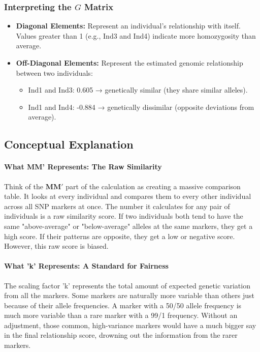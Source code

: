 \documentclass[12pt]{article}
\begin{document}
\subsubsection*{Interpreting the $G$ Matrix}

\begin{itemize}
    \item \textbf{Diagonal Elements:}
    Represent an individual's relationship with itself. Values greater than 1 (e.g., Ind3 and Ind4) indicate more homozygosity than average.

    \item \textbf{Off-Diagonal Elements:}
    Represent the estimated genomic relationship between two individuals:
    \begin{itemize}
        \item Ind1 and Ind3: 0.605 → genetically similar (they share similar alleles).
        \item Ind1 and Ind4: -0.884 → genetically dissimilar (opposite deviations from average).
    \end{itemize}
\end{itemize}

\subsection*{Conceptual Explanation}

\paragraph{What MM' Represents: The Raw Similarity}
Think of the $\mathbf{MM'}$ part of the calculation as creating a massive comparison table. It looks at every individual and compares them to every other individual across all SNP markers at once. The number it calculates for any pair of individuals is a raw similarity score. If two individuals both tend to have the same "above-average" or "below-average" alleles at the same markers, they get a high score. If their patterns are opposite, they get a low or negative score. However, this raw score is biased.

\paragraph{What 'k' Represents: A Standard for Fairness}
The scaling factor 'k' represents the total amount of expected genetic variation from all the markers. Some markers are naturally more variable than others just because of their allele frequencies. A marker with a 50/50 allele frequency is much more variable than a rare marker with a 99/1 frequency. Without an adjustment, those common, high-variance markers would have a much bigger say in the final relationship score, drowning out the information from the rarer markers.
\end{document}
